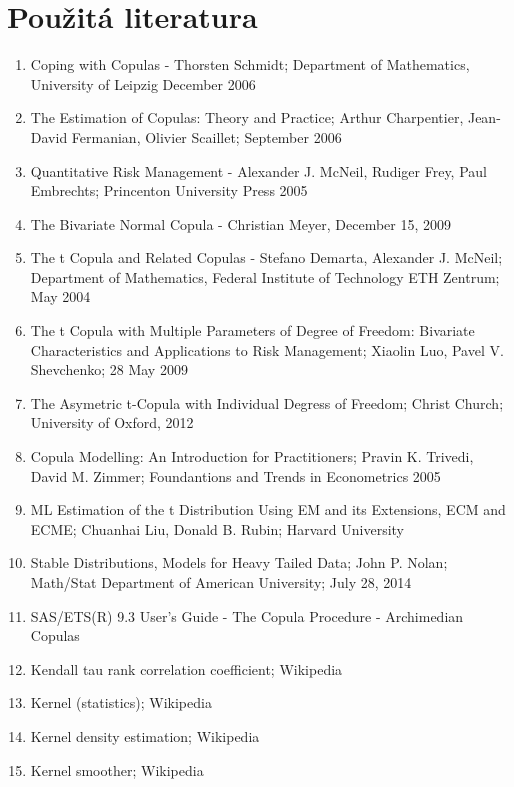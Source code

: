 \chapter{Použitá literatura}

\begin{enumerate}
\item Coping with Copulas - Thorsten Schmidt; Department of Mathematics, University of Leipzig December 2006
\item The Estimation of Copulas: Theory and Practice; Arthur Charpentier, Jean-David Fermanian, Olivier Scaillet; September 2006
\item Quantitative Risk Management - Alexander J. McNeil, Rudiger Frey, Paul Embrechts; Princenton University Press 2005
\item The Bivariate Normal Copula - Christian Meyer, December 15, 2009
\item The t Copula and Related Copulas - Stefano Demarta, Alexander J. McNeil; Department of Mathematics, Federal Institute of Technology ETH Zentrum; May 2004
\item The t Copula with Multiple Parameters of Degree of Freedom: Bivariate Characteristics and Applications to Risk Management; Xiaolin Luo, Pavel V. Shevchenko; 28 May 2009
\item The Asymetric t-Copula with Individual Degress of Freedom; Christ Church; University of Oxford, 2012
\item Copula Modelling: An Introduction for Practitioners; Pravin K. Trivedi, David M. Zimmer; Foundantions and Trends in Econometrics 2005
\item ML Estimation of the t Distribution Using EM and its Extensions, ECM and ECME; Chuanhai Liu, Donald B. Rubin; Harvard University
\item Stable Distributions, Models for Heavy Tailed Data; John P. Nolan; Math/Stat Department of American University; July 28, 2014
\item SAS/ETS(R) 9.3 User's Guide - The Copula Procedure - Archimedian Copulas
\item Kendall tau rank correlation coefficient; Wikipedia
\item Kernel (statistics); Wikipedia
\item Kernel density estimation; Wikipedia
\item Kernel smoother; Wikipedia
\end{enumerate}
